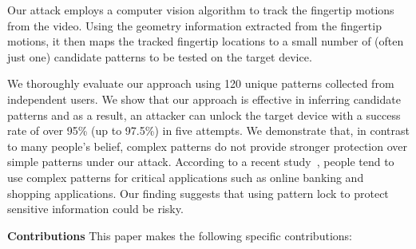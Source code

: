 Our attack employs a computer vision algorithm to
track the fingertip motions from the video. Using the geometry
information extracted from the fingertip motions, it then maps
the tracked fingertip locations to a small number of (often just one)
candidate patterns to be tested on the target device.

We thoroughly evaluate our approach using 120 unique patterns collected from independent users. We show that our approach is effective in inferring candidate patterns and as a result, an attacker can unlock
the target device with a success rate of over 95\% (up to 97.5\%) in five attempts.
We demonstrate that, in contrast to many people's belief, complex patterns do not provide stronger protection over simple patterns under our attack. According to a recent study~\cite{alpnorway}, people tend to use complex
patterns for critical applications such as online banking and shopping applications.
Our finding suggests that using pattern lock to protect sensitive information could be risky.
%


\noindent \textbf{Contributions} 
This paper makes the following specific contributions:


